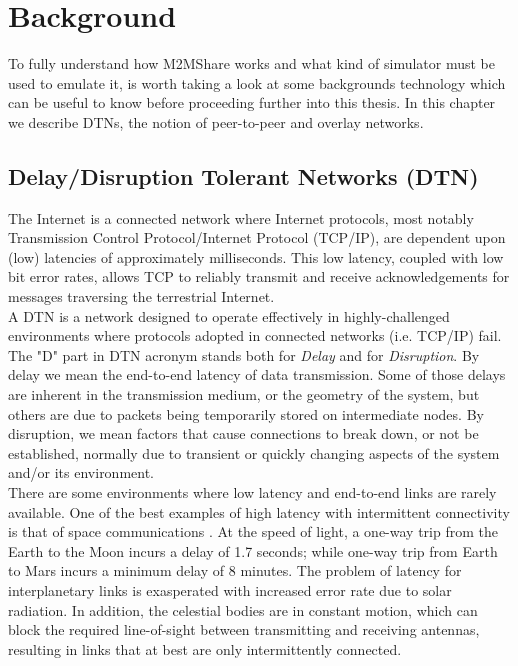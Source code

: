 
\chapter{Background}\label{background} %





To fully understand how M2MShare works and what kind of simulator must be used to emulate it, is worth taking a look at some backgrounds technology which can be useful to know before proceeding further into this thesis. In this chapter we describe DTNs, the notion of peer-to-peer and overlay networks.

\section{Delay/Disruption Tolerant Networks (DTN)}
The Internet is a connected network where Internet protocols, most notably Transmission Control Protocol/Internet Protocol (TCP/IP), are dependent upon (low) latencies of approximately milliseconds. This low latency, coupled with low bit error rates, allows TCP to reliably transmit and receive acknowledgements for messages traversing the terrestrial Internet. 
\\

A DTN is a network designed to operate effectively in highly-challenged environments where protocols adopted in connected networks (i.e. TCP/IP) fail. The "D" part in DTN acronym stands both for \textit{Delay} and for \textit{Disruption}. By delay we mean the end-to-end latency of data transmission. Some of those delays are inherent in the transmission medium, or the geometry of the system, but others are due to packets being temporarily stored on intermediate nodes. By disruption, we mean factors that cause connections to break down, or not be established, normally due to transient or quickly changing aspects of the system and/or its environment.
\\

There are some environments where low latency and end-to-end links are rarely available. One of the best examples of high latency with intermittent connectivity is that of space communications \cite{Burleigh2003365}. At the speed of light, a one-way trip from the Earth to the Moon incurs a delay of 1.7 seconds; while one-way trip from Earth to Mars incurs a minimum delay of 8 minutes. The problem of latency for interplanetary links is exasperated with increased error rate due to solar radiation. In addition, the celestial bodies are in constant motion, which can block the required line-of-sight between transmitting and receiving antennas, resulting in links that at best are only intermittently connected. 
\\

